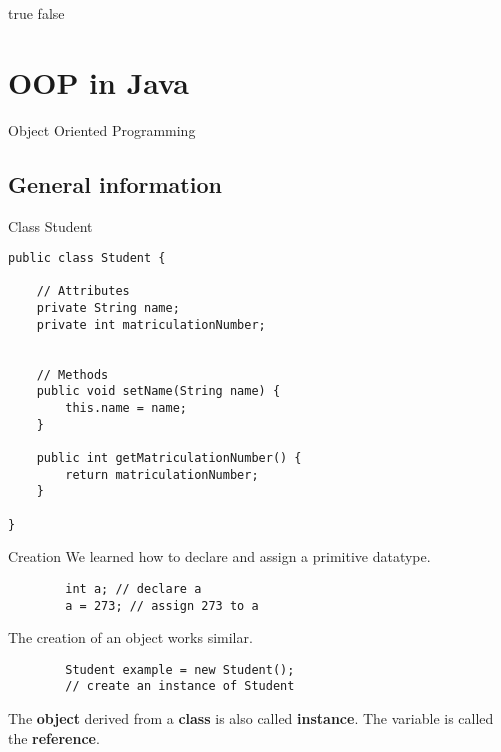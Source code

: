 \ifx true false
\section{OOP in Java}

\begin{frame}{}
	\begin{center}
		{\huge Object Oriented Programming}
	\end{center}
\end{frame}

\subsection{General information}

\begin{frame}[fragile]{Class Student}
\begin{lstlisting}
public class Student {

	// Attributes
	private String name; 
	private int matriculationNumber; 
	
	
	// Methods
	public void setName(String name) {
		this.name = name;
	}
    
	public int getMatriculationNumber() {
		return matriculationNumber;
	}
    
}
\end{lstlisting}


\end{frame}

\begin{frame}[fragile]{Creation}
	We learned how to declare and assign a primitive datatype.
	
	\begin{lstlisting}
	    int a; // declare a
	    a = 273; // assign 273 to a
	\end{lstlisting} 
	
	The creation of an object works similar.
	
	\begin{lstlisting}
	    Student example = new Student(); 
		// create an instance of Student
	\end{lstlisting}
	The \textbf{object} derived from a \textbf{class} is also called \textbf{instance}.
	The variable is called the \textbf{reference}.
\end{frame}

